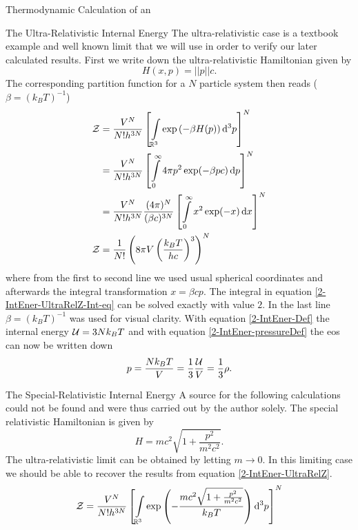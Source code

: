 \begin{section}{Thermodynamic Calculation of an }
\begin{subsection}{The Ultra-Relativistic Internal Energy}
The ultra-relativistic case is a textbook example and well known limit that we will use in order to verify our later calculated results. 
First we write down the ultra-relativistic Hamiltonian given by 
\begin{equation}
	H(x,p)=||p||c.
\end{equation}
The corresponding partition function for a $N$ particle system then reads ($\beta=(k_BT)^{-1}$)
\begin{align}
	\mathcal{Z} 	&= \frac{V^N}{N!h^{3N}}\left[\int\limits_{\mathbb{R}^3}\exp\left(- \beta H(p)\right)\mathop{}\!\mathrm{d}^3p\right]^N\\
		&= \frac{V^N}{N!h^{3N}}\left[\int\limits_0^\infty4\pi p^2\exp(-\beta pc) \mathop{}\!\mathrm{d} p\right]^N\\
		&= \frac{V^N}{N!h^{3N}}\frac{(4\pi)^N}{(\beta c)^{3N}}\left[\int\limits_0^\infty x^2\exp(-x) \mathop{}\!\mathrm{d} x\right]^N\label{2-IntEner-UltraRelZ-Int-eq}\\
	\mathcal{Z}	&= \frac{1}{N!}\left(8\pi V\left(\frac{k_BT}{hc}\right)^3\right)^N
	\label{2-IntEner-UltraRelZ}
\end{align}
where from the first to second line we used usual spherical coordinates and afterwards the integral transformation $x=\beta cp$.
The integral in equation \eqref{2-IntEner-UltraRelZ-Int-eq} can be solved exactly with value $2$. 
In the last line $\beta=(k_BT)^{-1}$ was used for visual clarity.
With equation \eqref{2-IntEner-Def} the internal energy $\mathcal{U} = 3Nk_BT$ and with equation \eqref{2-IntEner-pressureDef} the \ac{eos} can now be written down
\begin{equation}
	p = \frac{Nk_BT}{V} = \frac{1}{3}\frac{\mathcal{U}}{V} = \frac{1}{3}\rho.
	\label{2-IntEner-eos-nonrel}
\end{equation}
\end{subsection}
%
%
%
\begin{subsection}{The Special-Relativistic Internal Energy}
A source for the following calculations could not be found and were thus carried out by the author solely.
The special relativistic Hamiltonian is given by
\begin{equation}
	H=mc^2\sqrt{1+\frac{p^2}{m^2c^2}}.
\end{equation}
The ultra-relativistic limit can be obtained by letting $m\rightarrow0$. In this limiting case we should be able to recover the results from equation \eqref{2-IntEner-UltraRelZ}.
\begin{align}
	\Z 	&= \frac{V^N}{N!h^{3N}}\left[\int\limits_{\R^3}\exp\left(- \frac{mc^2\sqrt{1+\frac{p^2}{m^2c^2}}}{k_BT}\right)\diff^3p\right]^N\label{2-IntEner-EQ1}\\

\end{align}
\end{subsection}
\end{section}
